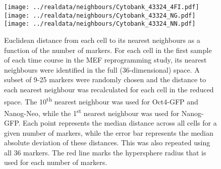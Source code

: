 \documentclass{article}
\begin{document}
\begin{figure}[p]
    \begin{center}
        \texttt{[image: ../realdata/neighbours/Cytobank\_43324\_4FI.pdf]}
        \texttt{[image: ../realdata/neighbours/Cytobank\_43324\_NG.pdf]}
        \texttt{[image: ../realdata/neighbours/Cytobank\_43324\_NN.pdf]}          
    \end{center}
    \caption{
        Euclidean distance from each cell to its nearest neighbours as a function of the number of markers.
        For each cell in the first sample of each time course in the MEF reprogramming study, its nearest neighbours were identified in the full (36-dimensional) space.
        A subset of 9-25 markers were randomly chosen and the distance to each nearest neighbour was recalculated for each cell in the reduced space.
        The 10\textsuperscript{th} nearest neighbour was used for Oct4-GFP and Nanog-Neo, while the 1\textsuperscript{st} nearest neighbour was used for Nanog-GFP.
        Each point represents the median distance across all cells for a given number of markers, while the error bar represents the median absolute deviation of these distances.
        This was also repeated using all 36 markers.
        The red line marks the hypersphere radius that is used for each number of markers.
    }
    \label{fig:radius}
\end{figure}
\end{document}
